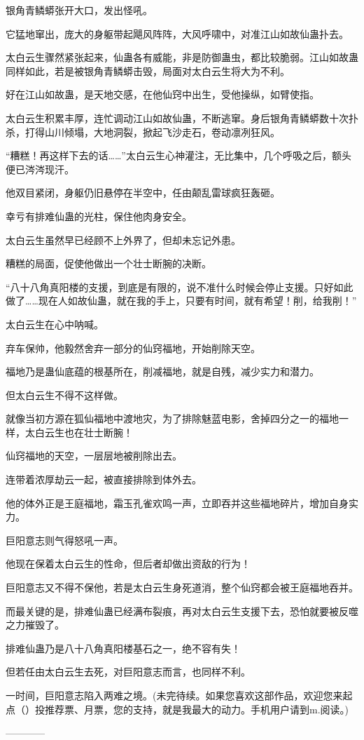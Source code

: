 \begin{this_body}
银角青鳞蟒张开大口，发出怪吼。

它猛地窜出，庞大的身躯带起飓风阵阵，大风呼啸中，对准江山如故仙蛊扑去。

太白云生骤然紧张起来，仙蛊各有威能，非是防御蛊虫，都比较脆弱。江山如故蛊同样如此，若是被银角青鳞蟒击毁，局面对太白云生将大为不利。

好在江山如故蛊，是天地交感，在他仙窍中出生，受他操纵，如臂使指。

太白云生积累丰厚，连忙调动江山如故仙蛊，不断逃窜。身后银角青鳞蟒数十次扑杀，打得山川倾塌，大地洞裂，掀起飞沙走石，卷动凛冽狂风。

“糟糕！再这样下去的话……”太白云生心神灌注，无比集中，几个呼吸之后，额头便已涔涔现汗。

他双目紧闭，身躯仍旧悬停在半空中，任由颠乱雷球疯狂轰砸。

幸亏有排难仙蛊的光柱，保住他肉身安全。

太白云生虽然早已经顾不上外界了，但却未忘记外患。

糟糕的局面，促使他做出一个壮士断腕的决断。

“八十八角真阳楼的支援，到底是有限的，说不准什么时候会停止支援。只好如此做了……现在人如故仙蛊，就在我的手上，只要有时间，就有希望！削，给我削！”

太白云生在心中呐喊。

弃车保帅，他毅然舍弃一部分的仙窍福地，开始削除天空。

福地乃是蛊仙底蕴的根基所在，削减福地，就是自残，减少实力和潜力。

但太白云生不得不这样做。

就像当初方源在狐仙福地中渡地灾，为了排除魅蓝电影，舍掉四分之一的福地一样，太白云生也在壮士断腕！

仙窍福地的天空，一层层地被削除出去。

连带着浓厚劫云一起，被直接排除到体外去。

他的体外正是王庭福地，霜玉孔雀欢鸣一声，立即吞并这些福地碎片，增加自身实力。

巨阳意志则气得怒吼一声。

他现在保着太白云生的性命，但后者却做出资敌的行为！

巨阳意志又不得不保他，若是太白云生身死道消，整个仙窍都会被王庭福地吞并。

而最关键的是，排难仙蛊已经满布裂痕，再对太白云生支援下去，恐怕就要被反噬之力摧毁了。

排难仙蛊乃是八十八角真阳楼基石之一，绝不容有失！

但若任由太白云生去死，对巨阳意志而言，也同样不利。

一时间，巨阳意志陷入两难之境。(未完待续。如果您喜欢这部作品，欢迎您来起点（）投推荐票、月票，您的支持，就是我最大的动力。手机用户请到m.阅读。)

------------

\end{this_body}

